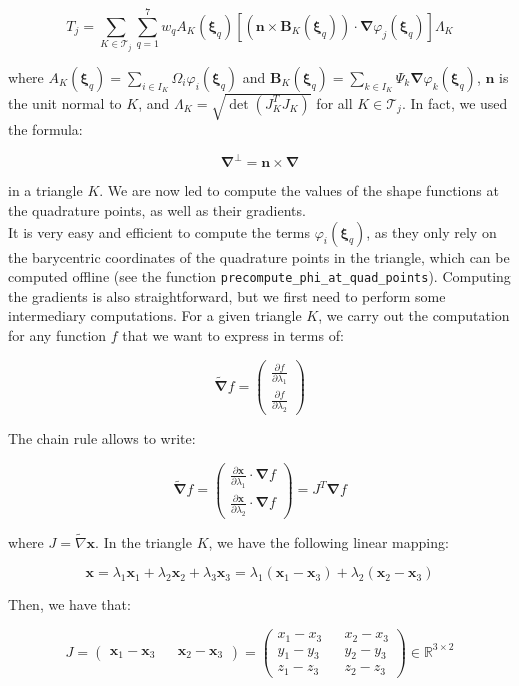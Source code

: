 \documentclass{article}
\theoremstyle{definition}
\theoremstyle{proposition}
\theoremstyle{theorem}
\theoremstyle{remark}
\theoremstyle{corollary}  %
\theoremstyle{exercise}
\theoremstyle{lemma}
\begin{document}
$$T_j = \sum_{K\in \mathcal{T}_j}  \sum_{q =1}^7 w_q A_K(\bm \xi_q) \left[\left(\bm n\times \bm B_K(\bm \xi_q)\right) \cdot \bm \nabla \varphi_j ( \bm \xi_q) \right]\Lambda_K$$

where $\displaystyle A_K(\bm \xi_q) = \sum_{i \in I_K} \Omega_i \varphi_i( \bm \xi_q)$ and $\displaystyle \bm B_K(\bm \xi_q) = \sum_{k \in I_K} \Psi_k \bm \nabla \varphi_k ( \bm \xi_q)$, $\bm n$ is the unit normal to $K$, and $\Lambda_K = \sqrt{\det(J_K^TJ_K)}$ for all $K \in \mathcal{T}_j$. In fact, we used the formula:

$$\bm \nabla^{\perp} = \bm n \times \bm \nabla$$

in a triangle $K$. We are now led to compute the values of the shape functions at the quadrature points, as well as their gradients. \\

It is very easy and efficient to compute the terms $\varphi_i(\bm \xi_q)$, as they only rely on the barycentric coordinates of the quadrature points in the triangle, which can be computed offline (see the function \texttt{precompute\_phi\_at\_quad\_points}). Computing the gradients is also straightforward, but we first need to perform some intermediary computations. For a given triangle $K$, we carry out the computation for any function $f$ that we want to express in terms of:

$$\widetilde{\bm \nabla} f = \begin{pmatrix}
    \frac{\partial f}{\partial \lambda_1}\\
    \frac{\partial f}{\partial \lambda_2} 
\end{pmatrix}$$

The chain rule allows to write:

$$\widetilde{\bm \nabla} f = \begin{pmatrix}
    \frac{\partial \bm x}{\partial \lambda_1} \cdot \bm \nabla f\\
    \frac{\partial \bm x}{\partial \lambda_2} \cdot \bm \nabla f
\end{pmatrix} = J^T \bm \nabla f$$

where $\displaystyle J = \widetilde{\nabla} \bm x$. In the triangle $K$, we have the following linear mapping:

$$\bm x = \lambda_1 \bm x_1 + \lambda_2 \bm x_2 + \lambda_3 \bm x_3 = \lambda_1(\bm x_1 - \bm x_3) + \lambda_2(\bm x_2 - \bm x_3) $$

Then, we have that: 

$$J = \begin{pmatrix}
    \bm x_1 - \bm x_3 && \bm x_2 - \bm x_3
\end{pmatrix} = \begin{pmatrix}
    x_1 - x_3 && x_2 - x_3 \\
    y_1 - y_3 && y_2 - y_3 \\
    z_1 - z_3 && z_2 - z_3
\end{pmatrix} \in \mathbb{R}^{3\times 2}$$
\end{document}
